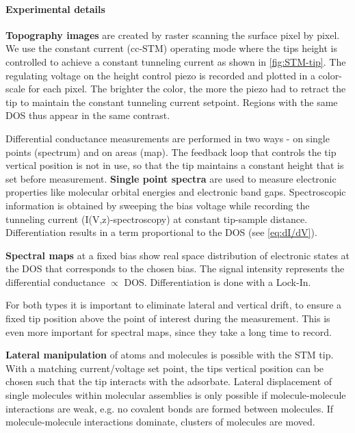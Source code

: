 \paragraph{Experimental details}

\textbf{Topography images} are created by raster scanning the surface pixel by pixel. 
We use the constant current (cc-STM) operating mode where the tips height is controlled to achieve a constant tunneling current as shown in \autoref{fig:STM-tip}. The regulating voltage on the height control piezo is recorded and plotted in a color-scale for each pixel. The brighter the color, the more the piezo had to retract the tip to maintain the constant tunneling current setpoint. Regions with the same DOS thus appear in the same contrast.


Differential conductance measurements are performed in two ways - on single points (spectrum) and on areas (map). The feedback loop that controls the tip vertical position is not in use, so that the tip maintains a constant height that is set before measurement. \textbf{Single point spectra} are used to measure electronic properties like molecular orbital energies and electronic band gaps. Spectroscopic information is obtained by sweeping the bias voltage while recording the tunneling current (I(V,z)-spectroscopy) at constant tip-sample distance. Differentiation results in a term proportional to the DOS (see \autoref{eq:dI/dV}).

\textbf{Spectral maps} at a fixed bias show real space distribution of electronic states at the DOS that corresponds to the chosen bias. The signal intensity represents the differential conductance $\propto$ DOS. Differentiation is done with a Lock-In.

For both types it is important to eliminate lateral and vertical drift, to ensure a fixed tip position above the point of interest during the measurement. This is even more important for spectral maps, since they take a long time to record.

\textbf{Lateral manipulation} of atoms and molecules is possible with the STM tip. With a matching current/voltage set point, the tips vertical position can be chosen such that the tip interacts with the adsorbate. Lateral displacement of single molecules within molecular assemblies is only possible if molecule-molecule interactions are weak, e.g. no covalent bonds are formed between molecules. If molecule-molecule interactions dominate, clusters of molecules are moved.

